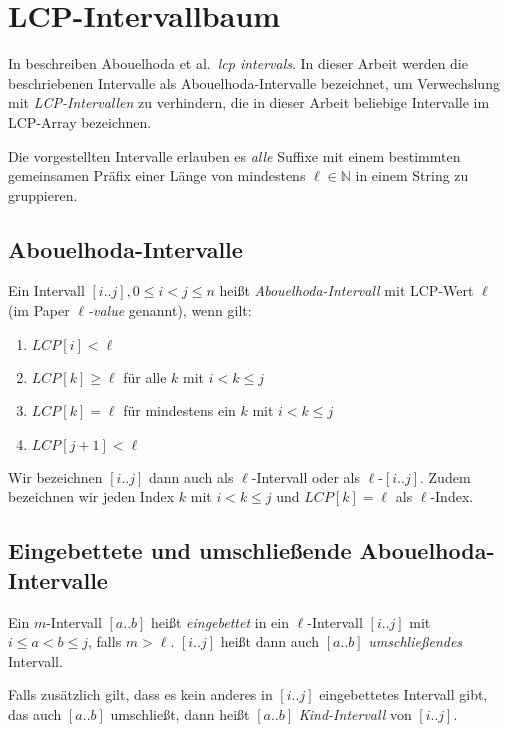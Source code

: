\section{LCP-Intervallbaum}
\label{lcpintervals}

In \cite{abouelhoda_optimal_2002} beschreiben Abouelhoda et al.\ \emph{lcp intervals}. In dieser Arbeit werden die beschriebenen Intervalle als Abouelhoda-Intervalle bezeichnet, um Verwechslung mit \textit{LCP-Intervallen} zu verhindern, die in dieser Arbeit beliebige Intervalle im LCP-Array bezeichnen.

Die vorgestellten Intervalle erlauben es \emph{alle} Suffixe mit einem bestimmten gemeinsamen Präfix einer Länge von mindestens $\ell \in \mathbb{N}$ in einem String zu gruppieren.

\subsection{Abouelhoda-Intervalle}
\label{abouelhodaintervals}

Ein Intervall $[i..j], 0 \leq i < j \leq n$ heißt \emph{Abouelhoda-Intervall} mit LCP-Wert $\ell$ (im Paper $\ell$\emph{-value} genannt), wenn gilt:

\begin{enumerate}
	\item $LCP[i] < \ell$
	\item $LCP[k] \geq \ell$ für alle $k$ mit $i < k \leq j$
	\item $LCP[k] = \ell$ für mindestens ein $k$ mit $i < k \leq j$
	\item $LCP[j + 1] < \ell$
\end{enumerate}

Wir bezeichnen $[i..j]$ dann auch als $\ell$-Intervall oder als $\ell$-$[i..j]$. Zudem bezeichnen wir jeden Index $k$ mit $i < k \leq j$ und $LCP[k] = \ell$ als $\ell$-Index.

\subsection{Eingebettete und umschließende Abouelhoda-Intervalle}
\label{embeddedlcpintervals}

Ein $m$-Intervall $[a..b]$ heißt \textit{eingebettet} in ein $\ell$-Intervall $[i..j]$ mit $i \leq a < b \leq j$, falls $m > \ell$. $[i..j]$ heißt dann auch $[a..b]$ \textit{umschließendes} Intervall.

Falls zusätzlich gilt, dass es kein anderes in $[i..j]$ eingebettetes Intervall gibt, das auch $[a..b]$ umschließt, dann heißt $[a..b]$ \textit{Kind-Intervall} von $[i..j]$.

